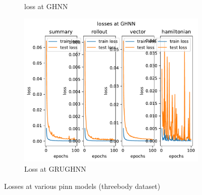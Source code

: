 \begin{figure}[H]
\begin{subfigure}[b]{0.3\textwidth}
		\caption{loss at GHNN}
		\label{fig:image2}
	\end{subfigure}
	\hfill
	\begin{subfigure}[b]{0.3\textwidth}
		\centering
		\includegraphics[width=\textwidth]{chapters/chapter5/figonly_grughnn_loss.pdf}
		\caption{Loss at GRUGHNN}
		\label{fig:image3}
	\end{subfigure}
	
	\caption{Losses at various pinn models (threebody dataset)}
	\label{div_loss}
\end{figure}

